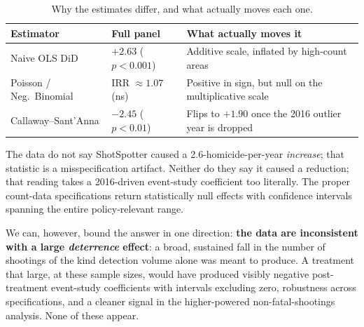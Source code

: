 \documentclass[12pt]{article}
\begin{document}
\begin{table}[H]
\centering
\small
\caption{Why the estimates differ, and what actually moves each one.}
\label{tab:summary}
\begin{tabular}{p{}p{}p{}}
\toprule
Estimator & Full panel & What actually moves it \\
\midrule
Naive OLS DiD & $+2.63$ ($p < 0.001$) & Additive scale, inflated by high-count areas \\
Poisson / Neg.\ Binomial & IRR $\approx 1.07$ (ns) & Positive in sign, but null on the multiplicative scale \\
Callaway--Sant'Anna & $-2.45$ ($p < 0.01$) & Flips to $+1.90$ once the 2016 outlier year is dropped \\
\bottomrule
\end{tabular}
\end{table}

The data do not say ShotSpotter caused a 2.6-homicide-per-year \emph{increase}; that
statistic is a misspecification artifact. Neither do they say it caused a reduction; that
reading takes a 2016-driven event-study coefficient too literally. The proper count-data
specifications return statistically null effects with confidence intervals spanning the
entire policy-relevant range.

We can, however, bound the answer in one direction: \textbf{the data are inconsistent with
a large \emph{deterrence} effect}: a broad, sustained fall in the number of shootings of
the kind detection volume alone was meant to produce. A treatment that large, at these
sample sizes, would have produced visibly negative post-treatment event-study coefficients
with intervals excluding zero, robustness across specifications, and a cleaner signal in
the higher-powered non-fatal-shootings analysis. None of these appear.
\end{document}
